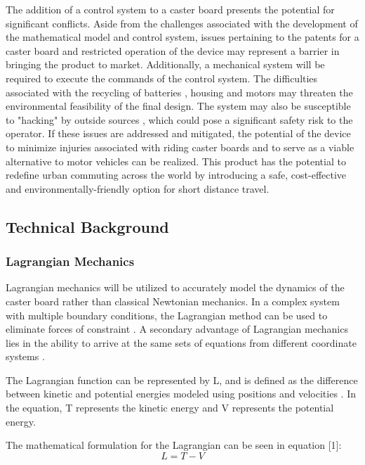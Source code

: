 The addition of a control system to a caster board presents the potential for significant conflicts. 
Aside from the challenges associated with the development of the mathematical model and control system, issues pertaining to the patents for a caster board \cite{casterboardPatent} and restricted operation of the device \cite{TOLaws} may represent a barrier in bringing the product to market. 
Additionally, a mechanical system will be required to execute the commands of the control system. 
The difficulties associated with the recycling of batteries \cite{BatteryRecharge}, housing \cite{PlasticAssessment} and motors may threaten the environmental feasibility of the final design. 
The system may also be susceptible to "hacking" by outside sources \cite{DEFCON}, which could pose a significant safety risk to the operator. 
If these issues are addressed and mitigated, the potential of the device to minimize injuries associated with riding caster boards and to serve as a viable alternative to motor vehicles can be realized. 
This product has the potential to redefine urban commuting across the world by introducing a safe, cost-effective and environmentally-friendly option for short distance travel. 


\subsection{Technical Background} \label{introMath}
\subsubsection{Lagrangian Mechanics}
Lagrangian mechanics will be utilized to accurately model the dynamics of the caster board rather than classical Newtonian mechanics. 
In a complex system with multiple boundary conditions, the Lagrangian method can be used to eliminate forces of constraint \cite{LagrangePowerpoint}. 
A secondary advantage of Lagrangian mechanics lies in the ability to arrive at the same sets of equations from different coordinate systems \cite{LagrangePowerpoint}. 

The Lagrangian function can be represented by L, and is defined as the difference between kinetic and potential energies modeled using positions and velocities \cite{NonholonomicPowerpoint}. 
In the equation, T represents the kinetic energy and V represents the potential energy.

The mathematical formulation for the Lagrangian can be seen in equation [1]: 
\begin{equation}
L=T-V
\end{equation}

